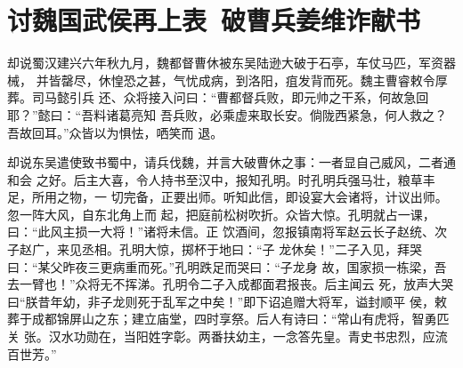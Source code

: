 \chapter{讨魏国武侯再上表~破曹兵姜维诈献书}

却说蜀汉建兴六年秋九月，魏都督曹休被东吴陆逊大破于石亭，车仗马匹，军资器械，
并皆罄尽，休惶恐之甚，气忧成病，到洛阳，疽发背而死。魏主曹睿敕令厚葬。司马懿引兵
还、众将接入问曰：“曹都督兵败，即元帅之干系，何故急回耶？”懿曰：“吾料诸葛亮知
吾兵败，必乘虚来取长安。倘陇西紧急，何人救之？吾故回耳。”众皆以为惧怯，哂笑而
退。

却说东吴遣使致书蜀中，请兵伐魏，并言大破曹休之事：一者显自己威风，二者通和会
之好。后主大喜，令人持书至汉中，报知孔明。时孔明兵强马壮，粮草丰足，所用之物，一
切完备，正要出师。听知此信，即设宴大会诸将，计议出师。忽一阵大风，自东北角上而
起，把庭前松树吹折。众皆大惊。孔明就占一课，曰：“此风主损一大将！”诸将未信。正
饮酒间，忽报镇南将军赵云长子赵统、次子赵广，来见丞相。孔明大惊，掷杯于地曰：“子
龙休矣！”二子入见，拜哭曰：“某父昨夜三更病重而死。”孔明跌足而哭曰：“子龙身
故，国家损一栋梁，吾去一臂也！”众将无不挥涕。孔明令二子入成都面君报丧。后主闻云
死，放声大哭曰“朕昔年幼，非子龙则死于乱军之中矣！”即下诏追赠大将军，谥封顺平
侯，敕葬于成都锦屏山之东；建立庙堂，四时享祭。后人有诗曰：“常山有虎将，智勇匹关
张。汉水功勋在，当阳姓字彰。两番扶幼主，一念答先皇。青史书忠烈，应流百世芳。”

